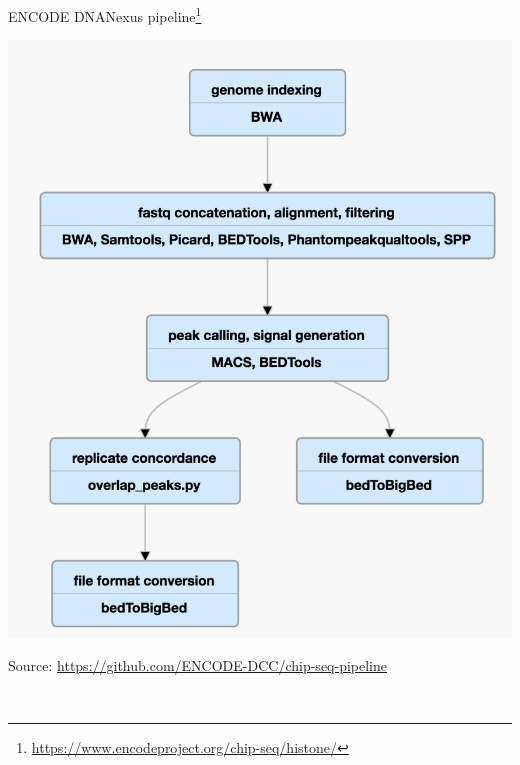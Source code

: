 \documentclass{beamer}
\begin{document}
\begin{frame}{ENCODE DNANexus pipeline\footnote{\url{https://www.encodeproject.org/chip-seq/histone/}}}
\begin{center}
\includegraphics[height=0.65\paperheight]{encodednanexus.png}
\end{center}
Source: \small{\url{https://github.com/ENCODE-DCC/chip-seq-pipeline}}
\end{frame}


\begin{frame}
\vspace{4cm}
\\[3cm]
\end{frame}
\end{document}
